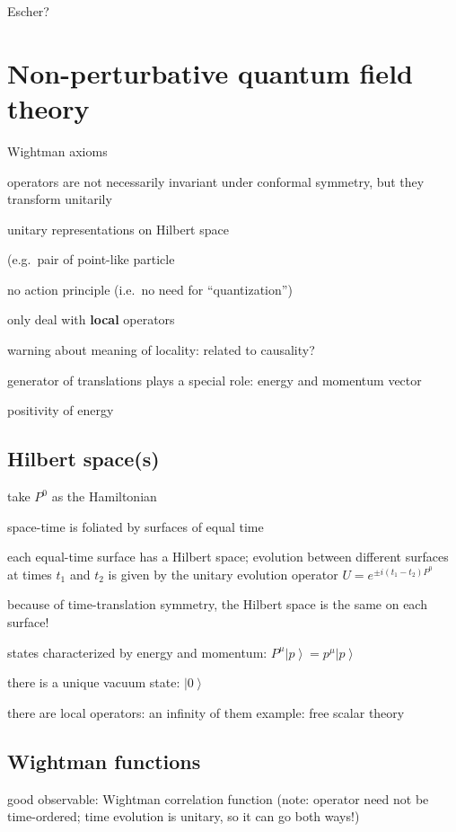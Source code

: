 \documentclass[a4paper,12pt]{article}
\newcommand{\ket}[1]{\left| #1 \right\rangle}
\numberwithin{equation}{section}
\begin{document}
Escher?





\section{Non-perturbative quantum field theory}

Wightman axioms

operators are not necessarily invariant under conformal symmetry, but they transform unitarily

unitary representations on Hilbert space

(e.g.~pair of point-like particle

no action principle
(i.e.~no need for ``quantization'')


only deal with \textbf{local} operators

warning about meaning of locality: related to causality?



generator of translations plays a special role: energy and momentum vector

positivity of energy 

\subsection{Hilbert space(s)}

take $P^0$ as the Hamiltonian

space-time is foliated by surfaces of equal time

each equal-time surface has a Hilbert space; evolution between different surfaces at times $t_1$ and $t_2$ is given by the unitary evolution operator $U = e^{\pm i (t_1 - t_2) P^0}$

because of time-translation symmetry, the Hilbert space is the same on each surface!

states characterized by energy and momentum: $P^\mu \ket{p} = p^\mu \ket{p}$

there is a unique vacuum state: $\ket{0}$

there are local operators: an infinity of them
example: free scalar theory

\subsection{Wightman functions}

good observable: Wightman correlation function
(note: operator need not be time-ordered; time evolution is unitary, so it can go both ways!)
\end{document}
